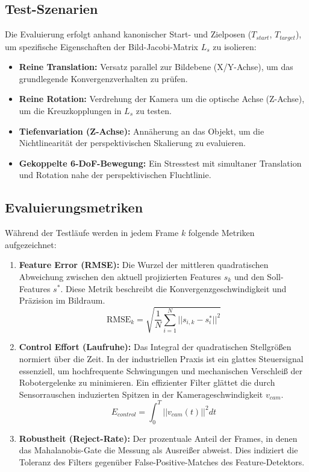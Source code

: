 \documentclass{article}
\begin{document}
\subsection{Test-Szenarien}
Die Evaluierung erfolgt anhand kanonischer Start- und Zielposen ($T_{start}$, $T_{target}$), um spezifische Eigenschaften der Bild-Jacobi-Matrix $L_s$ zu isolieren:
\begin{itemize}
    \item \textbf{Reine Translation:} Versatz parallel zur Bildebene (X/Y-Achse), um das grundlegende Konvergenzverhalten zu prüfen.
    \item \textbf{Reine Rotation:} Verdrehung der Kamera um die optische Achse (Z-Achse), um die Kreuzkopplungen in $L_s$ zu testen.
    \item \textbf{Tiefenvariation (Z-Achse):} Annäherung an das Objekt, um die Nichtlinearität der perspektivischen Skalierung zu evaluieren.
    \item \textbf{Gekoppelte 6-DoF-Bewegung:} Ein Stresstest mit simultaner Translation und Rotation nahe der perspektivischen Fluchtlinie.
\end{itemize}

\subsection{Evaluierungsmetriken}
Während der Testläufe werden in jedem Frame $k$ folgende Metriken aufgezeichnet:
\begin{enumerate}
    \item \textbf{Feature Error (RMSE):} Die Wurzel der mittleren quadratischen Abweichung zwischen den aktuell projizierten Features $s_k$ und den Soll-Features $s^*$. Diese Metrik beschreibt die Konvergenzgeschwindigkeit und Präzision im Bildraum.
    \begin{equation}
        \text{RMSE}_k = \sqrt{\frac{1}{N} \sum_{i=1}^{N} ||s_{i,k} - s_{i}^*||^2}
    \end{equation}
    \item \textbf{Control Effort (Laufruhe):} Das Integral der quadratischen Stellgrößen normiert über die Zeit. In der industriellen Praxis ist ein glattes Steuersignal essenziell, um hochfrequente Schwingungen und mechanischen Verschleiß der Robotergelenke zu minimieren. Ein effizienter Filter glättet die durch Sensorrauschen induzierten Spitzen in der Kamerageschwindigkeit $v_{cam}$.
    \begin{equation}
        E_{control} = \int_{0}^{T} ||v_{cam}(t)||^2 dt
    \end{equation}
    \item \textbf{Robustheit (Reject-Rate):} Der prozentuale Anteil der Frames, in denen das Mahalanobis-Gate die Messung als Ausreißer abweist. Dies indiziert die Toleranz des Filters gegenüber False-Positive-Matches des Feature-Detektors.
\end{enumerate}
\end{document}
